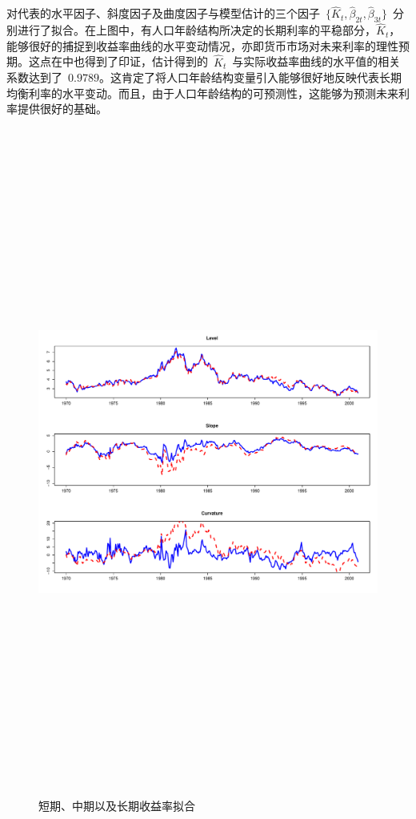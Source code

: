  对代表\tsm 的水平因子、斜度因子及曲度因子与模型估计的三个因子~$\{\hat{K}_{t}, \hat{\beta}_{2t}, \hat{\beta}_{3t}\}$~分别进行了拟合。在上图中，有人口年龄结构所决定的长期利率的平稳部分，$\hat{K}_{t}$，能够很好的捕捉到收益率曲线的水平变动情况，亦即货币市场对未来利率的理性预期。这点在中也得到了印证，估计得到的~$\hat{K}_{t}$~与实际收益率曲线的水平值的相关系数达到了~$0.9789$。这肯定了将人口年龄结构变量引入\tsm 能够很好地反映代表长期均衡利率的水平变动。而且，由于人口年龄结构的可预测性，这能够为预测未来利率提供很好的基础。
  \begin{figure}%
      \includegraphics[width=15cm,height=22cm]{figures/Rplot04}
     \caption{短期、中期以及长期收益率拟合}
     \label{Rplot04}
 \end{figure}
 
